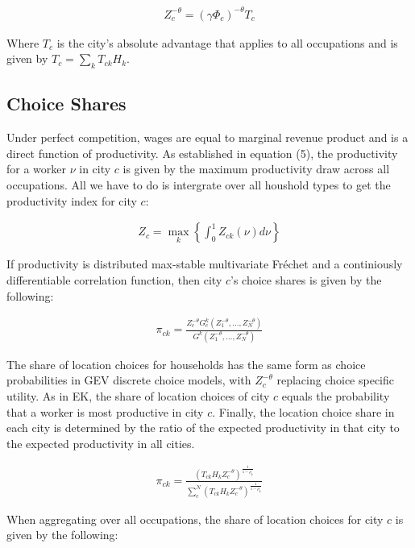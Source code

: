 \documentclass[10pt]{article}
\begin{document}
\begin{align}
    Z_c^{-\theta} = (\gamma \Phi_c)^{-\theta} T_c
\end{align}

Where $T_c$ is the city's absolute advantage that applies to all occupations and is given by $T_c = \sum_{k}^{} T_{ck} H_k$.

\subsection{Choice Shares}

Under perfect competition, wages are equal to marginal revenue product and is a direct function of productivity. As established in equation (5), the productivity for a worker $\nu$ in city $c$ is given by the maximum productivity draw across all occupations. All we have to do is intergrate over all houshold types to get the productivity index for city $c$:

\begin{align}
    Z_c = \max_k \left\{ \int_{0}^{1} Z_{ck} (\nu) d\nu \right\}
\end{align}

If productivity is distributed max-stable multivariate Fréchet and a continiously differentiable correlation function, then city $c$'s choice shares is given by the following:

\begin{align}
    \pi_{ck} = \frac{Z_c^{-\theta} G_c^k(Z_1^{-\theta}, \dots, Z_N^{-\theta})}{G^k(Z_1^{-\theta}, \dots, Z_N^{-\theta})}
\end{align}

The share of location choices for households has the same form as choice probabilities in GEV discrete choice models, with $Z_c^{-\theta}$ replacing choice specific utility. As in EK, the share of location choices of city $c$ equals the probability that a worker is most productive in city $c$. Finally, the location choice share in each city is determined by the ratio of the expected productivity in that city to the expected productivity in all cities.

\begin{align}
    \pi_{ck} = \frac{(T_{ck} H_k Z_c^{-\theta})^{\frac{1}{1 - \rho_k}}}{\sum_{c}^{N} (T_{ck} H_k Z_c^{-\theta})^{\frac{1}{1 - \rho_k}}}
\end{align}

When aggregating over all occupations, the share of location choices for city $c$ is given by the following:
\end{document}
